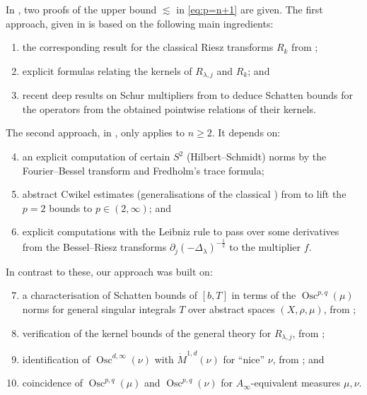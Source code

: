 \documentclass[reqno]{amsart}
\theoremstyle{plain}
\theoremstyle{definition}
\theoremstyle{remark}
\begin{document}
In \cite{FLSZ}, two proofs of the upper bound $\lesssim$ in \eqref{eq:p=n+1} are given. The first approach, given in \cite[Sections 3--5]{FLSZ} is based on the following main ingredients:
\begin{enumerate}[\rm(a)]
  \item the corresponding result for the classical Riesz transforms $R_k$ from \cite{LMSZ}; 
  \item explicit formulas relating the kernels of $R_{\lambda,j}$ and $R_k$; and
  \item recent deep results on Schur multipliers from \cite{CGPT} to deduce Schatten bounds for the operators from the obtained pointwise relations of their kernels.
\end{enumerate}
The second approach, in \cite[Sections 6]{FLSZ}, only applies to $n\geq 2$. It depends on:
\begin{enumerate}[\rm(a)]\setcounter{enumi}{3}
  \item an explicit computation of certain $S^2$ (Hilbert--Schmidt) norms by the Fourier--Bessel transform and Fredholm's trace formula;
  \item abstract Cwikel estimates (generalisations of the classical \cite{Cwikel}) from \cite{LSZ:20} to lift the $p=2$ bounds to $p\in(2,\infty)$; and 
  \item explicit computations with the Leibniz rule to pass over some derivatives from the Bessel--Riesz transforms $\partial_j(-\Delta_\lambda)^{-\frac12}$ to the multiplier $f$.
\end{enumerate}

In contrast to these, our approach was built on:
\begin{enumerate}[\rm(a)]\setcounter{enumi}{6}
  \item\label{it:HytSp} a characterisation of Schatten bounds of $[b,T]$ in terms of the $\operatorname{Osc}^{p,q}(\mu)$ norms for general singular integrals $T$ over abstract spaces $(X,\rho,\mu)$, from \cite{Hyt:Sp,RS:NWO};
  \item\label{it:FLLX} verification of the kernel bounds of the general theory for $R_{\lambda,j}$, from \cite{FLLX};
  \item identification of $\operatorname{Osc}^{d,\infty}(\nu)$ with $\dot M^{1,d}(\nu)$ for ``nice'' $\nu$, from \cite{Hyt:Sp,HK:W1p}; and
  \item\label{it:invar} coincidence of $\operatorname{Osc}^{p,q}(\mu)$ and $\operatorname{Osc}^{p,q}(\nu)$ for $A_\infty$-equivalent measures $\mu,\nu$.
\end{enumerate}
\end{document}
